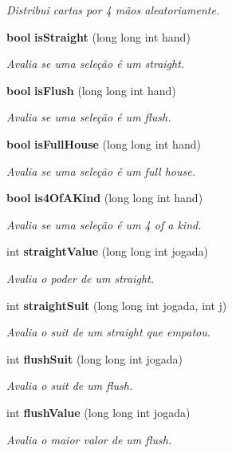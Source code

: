 \begin{DoxyCompactItemize}
\begin{DoxyCompactList}\small\item\em Distribui cartas por 4 mãos aleatoriamente. \end{DoxyCompactList}\item 
{\bf bool} {\bf is\+Straight} (long long int hand)
\begin{DoxyCompactList}\small\item\em Avalia se uma seleção é um straight. \end{DoxyCompactList}\item 
{\bf bool} {\bf is\+Flush} (long long int hand)
\begin{DoxyCompactList}\small\item\em Avalia se uma seleção é um flush. \end{DoxyCompactList}\item 
{\bf bool} {\bf is\+Full\+House} (long long int hand)
\begin{DoxyCompactList}\small\item\em Avalia se uma seleção é um full house. \end{DoxyCompactList}\item 
{\bf bool} {\bf is4\+Of\+A\+Kind} (long long int hand)
\begin{DoxyCompactList}\small\item\em Avalia se uma seleção é um 4 of a kind. \end{DoxyCompactList}\item 
int {\bf straight\+Value} (long long int jogada)
\begin{DoxyCompactList}\small\item\em Avalia o poder de um straight. \end{DoxyCompactList}\item 
int {\bf straight\+Suit} (long long int jogada, int j)
\begin{DoxyCompactList}\small\item\em Avalia o suit de um straight que empatou. \end{DoxyCompactList}\item 
int {\bf flush\+Suit} (long long int jogada)
\begin{DoxyCompactList}\small\item\em Avalia o suit de um flush. \end{DoxyCompactList}\item 
int {\bf flush\+Value} (long long int jogada)
\begin{DoxyCompactList}\small\item\em Avalia o maior valor de um flush. \end{DoxyCompactList}\item 

\end{DoxyCompactItemize}
